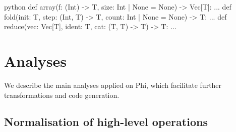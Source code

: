 \vspace*{\fill}
\begin{tcolorbox}[colback=blue!5!white,colframe=blue!60!black,title=\textsc{Signatures of combinators in Ein}]
\begin{center}
\begin{cminted}{python}
def array(f: (Int) -> T, size: Int | None = None) -> Vec[T]: ...
def fold(init: T, step: (Int, T) -> T, count: Int | None = None) -> T: ...
def reduce(vec: Vec[T], ident: T, cat: (T, T) -> T) -> T: ...
\end{cminted}
\end{center}
\end{tcolorbox}
\vspace*{\fill}



\needspace{15em}
\section{Analyses}
\label{compiler-analyses}

We describe the main analyses applied on Phi, which facilitate further transformations and code generation. 

\subsection{Normalisation of high-level operations}
\label{high-levels}

